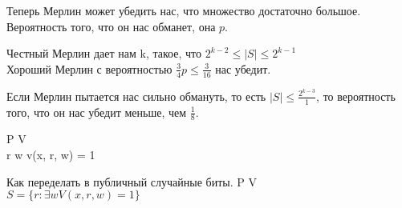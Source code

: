 Теперь Мерлин может убедить нас, что множество достаточно большое. Вероятность того, что он нас обманет, 
она $p$.

Честный Мерлин дает нам k, такое, что $2^{k - 2} \le |S| \le 2^{k - 1}$ \\
Хороший Мерлин с вероятностью $\frac{3}{4}p \le \frac{3}{16}$ нас убедит.

Если Мерлин пытается нас сильно обмануть, то есть $|S| \le \frac{2^{k - 3}}1$, то 
вероятность того, что он нас убедит меньше, чем $\frac{1}{8}$.


P V\\
  r
w
  v(x, r, w) = 1


Как переделать в публичный случайные биты. 
P V\\


$S = \{r \colon \exists w V(x, r, w) = 1\}$\\

 